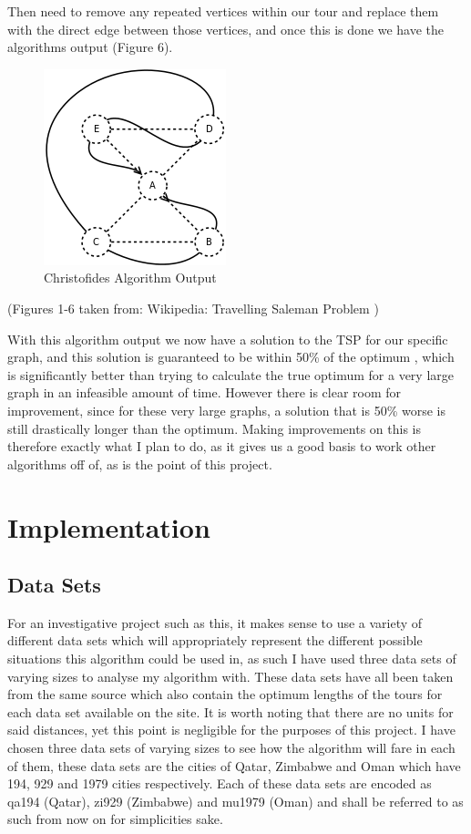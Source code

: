 \documentclass[11pt,a4paper,titlepage]{article}
\begin{document}
Then need to remove any repeated vertices within our tour and replace them with the direct edge between those vertices, and once this is done we have the algorithms output (Figure 6).

\begin{figure}[ht]
\includegraphics[scale=0.6]{WikiRemove}
\centering
\caption{Christofides Algorithm Output}
\end{figure}

(Figures 1-6 taken from: Wikipedia: Travelling Saleman Problem \cite{TSPWiki})

With this algorithm output we now have a solution to the TSP for our specific graph, and this solution is guaranteed to be within 50\% of the optimum \cite{ChrAlg}, which is significantly better than trying to calculate the true optimum for a very large graph in an infeasible amount of time. However there is clear room for improvement, since for these very large graphs, a solution that is 50\% worse is still drastically longer than the optimum. Making improvements on this is therefore exactly what I plan to do, as it gives us a good basis to work other algorithms off of, as is the point of this project.

\section{Implementation}

\subsection{Data Sets}

For an investigative project such as this, it makes sense to use a variety of different data sets which will appropriately represent the different possible situations this algorithm could be used in, as such I have used three data sets of varying sizes to analyse my algorithm with. These data sets have all been taken from the same source \cite{TSPRep1} which also contain the optimum lengths of the tours for each data set available on the site. It is worth noting that there are no units for said distances, yet this point is negligible for the purposes of this project. I have chosen three data sets of varying sizes to see how the algorithm will fare in each of them, these data sets are the cities of Qatar, Zimbabwe and Oman which have 194, 929 and 1979 cities respectively. Each of these data sets are encoded as qa194 (Qatar), zi929 (Zimbabwe) and mu1979 (Oman) and shall be referred to as such from now on for simplicities sake.
\pagebreak
\end{document}
